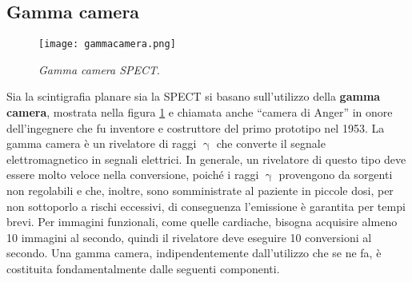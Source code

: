 \documentclass{report}
\newcommand{\virgolette}[1]{``#1''}
\newcommand{\figref}[1]{figura \ref{#1}}
\numberwithin{equation}{section}
\numberwithin{figure}{section}
\begin{document}
\subsection{Gamma camera}
\begin{figure}[htp]
    \centering
    \texttt{[image: gammacamera.png]}
    \caption{\label{fig:gammacamera} \textit{Gamma camera SPECT}.}
\end{figure}

\noindent Sia la scintigrafia planare sia la SPECT si basano sull'utilizzo della \textbf{gamma camera}, mostrata nella \figref{fig:gammacamera} e chiamata anche \virgolette{camera di Anger} in onore dell'ingegnere che fu inventore e costruttore del primo prototipo nel 1953. La gamma camera è un rivelatore di raggi $\upgamma$ che converte il segnale elettromagnetico in segnali elettrici. In generale, un rivelatore di questo tipo deve essere molto veloce nella conversione, poiché i raggi $\upgamma$ provengono da sorgenti non regolabili e che, inoltre, sono somministrate al paziente in piccole dosi, per non sottoporlo a rischi eccessivi, di conseguenza l'emissione è garantita per tempi brevi. Per immagini funzionali, come quelle cardiache, bisogna acquisire almeno 10 immagini al secondo, quindi il rivelatore deve eseguire 10 conversioni al secondo. Una gamma camera, indipendentemente dall'utilizzo che se ne fa, è costituita fondamentalmente dalle seguenti componenti.
\end{document}
